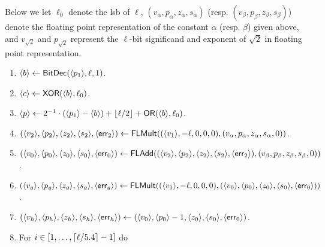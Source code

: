   Below we let $\ell_0$ denote the lsb of $\ell$,
$(v_\alpha,p_\alpha,z_\alpha,s_\alpha)$
  (resp.  $(v_\beta,p_\beta,z_\beta,s_\beta)$)
  denote the floating point representation of the constant $\alpha$ (resp. $\beta$)
  given above,
  and $v_{\sqrt{2}}$ and $p_{\sqrt{2}}$ represent the $\ell$-bit significand and exponent of
$\sqrt{2}$ in floating point representation.
  \begin{enumerate}
    \item $\langle b \rangle \leftarrow \mathsf{BitDec}(\langle p_1 \rangle,\ell,1)$.
    \item $\langle c \rangle \leftarrow \mathsf{XOR}(\langle b \rangle,\ell_0)$.
    \item $\langle p \rangle \leftarrow 2^{-1} \cdot (\langle p_1 \rangle-\langle b \rangle)
            +{\lfloor \ell/2 \rfloor}+\mathsf{OR}(\langle b \rangle,\ell_0)$.
    \item $(\langle v_2 \rangle,\langle p_2 \rangle,\langle z_2 \rangle,\langle s_2 \rangle,\langle \mathsf{err}_2 \rangle)
            \leftarrow \mathsf{FLMult}((\langle v_1 \rangle,-\ell,0,0,0),(v_\alpha,p_\alpha,z_\alpha,s_\alpha,0))$.
    \item $(\langle v_0 \rangle,\langle p_0 \rangle,\langle z_0 \rangle,\langle s_0 \rangle,\langle \mathsf{err}_0 \rangle)
            \leftarrow \mathsf{FLAdd}((\langle v_2 \rangle,\langle p_2 \rangle,\langle z_2 \rangle,\langle s_2 \rangle,\langle \mathsf{err}_2 \rangle),(v_\beta,p_\beta,z_\beta,s_\beta,0))$.
    \item $(\langle v_g \rangle,\langle p_g \rangle,\langle z_g \rangle,\langle s_g \rangle,\langle \mathsf{err}_g \rangle)
            \leftarrow \mathsf{FLMult}((\langle v_1 \rangle,-\ell,0,0,0),(\langle v_0 \rangle,\langle p_0 \rangle,\langle z_0 \rangle,\langle s_0 \rangle,\langle \mathsf{err}_0 \rangle))$.
    \item  $(\langle v_h \rangle,\langle p_h \rangle,\langle z_h \rangle,\langle s_h \rangle,\langle \mathsf{err}_h \rangle)
            \leftarrow   (\langle v_0 \rangle,\langle p_0 \rangle-1,\langle z_0 \rangle,\langle s_0 \rangle,\langle \mathsf{err}_0 \rangle)$.
    \item For $i \in [1,\ldots,{\lceil \ell/5.4 \rceil}-1]$ do
\end{enumerate}
